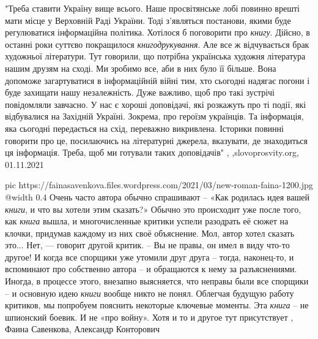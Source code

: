 "Треба ставити Україну вище всього. Наше просвітянське лобі повинно врешті мати
місце у Верховній Раді України. Тоді з’являться постанови, якими буде
регулюватися інформаційна політика.  Хотілося б поговорити про \emph{книгу}. Дійсно, в
останні роки суттєво покращилося \emph{книгодрукування}. Але все ж відчувається брак
художньої літератури. Тут говорили, що потрібна українська художня література
нашим друзям на сході. Ми зробимо все, аби в них було її більше. Вона допоможе
загартуватися в інформаційній війні тим, хто сьогодні надягає погони і буде
захищати нашу незалежність. Дуже важливо, щоб про такі зустрічі повідомляли
завчасно. У нас є хороші доповідачі, які розкажуть про ті події, які
відбувалися на Західній Україні. Зокрема, про героїзм українців. Та інформація,
яка сьогодні передається на схід, переважно викривлена. Історики повинні
говорити про це, посилаючись на літературні джерела, вказувати, де знаходиться
ця інформація. Треба, щоб ми готували таких доповідачів"
, ,slovoprosvity.org, 01.11.2021

\ifcmt
  pic https://fainasavenkova.files.wordpress.com/2021/03/new-roman-faina-1200.jpg
  @width 0.4
\fi
Очень часто автора обычно спрашивают – «Как родилась идея вашей \emph{книги}, и
что вы хотели этим сказать?» Обычно это происходит уже после того, как
\emph{книга} вышла, и многочисленные критики успели разодрать её сюжет на
клочки, придумав каждому из них своё объяснение. Мол, автор хотел сказать
это...  Нет, — говорит другой критик. – Вы не правы, он имел в виду что-то
другое!  И когда все спорщики уже утомили друг друга – тогда, наконец-то, и
вспоминают про собственно автора – и обращаются к нему за разъяснениями.
Иногда, в процессе этого, внезапно выясняется, что неправы были все спорщики –
и основную идею \emph{книги} вообще никто не понял.  Облегчая будущую работу
критиков, мы попробуем пояснить некоторые ключевые моменты.  Эта \emph{книга} –
не шпионский боевик. И не «про войну». Хотя и то и другое тут присутствует
, Фаина Савенкова, Александр Конторович

